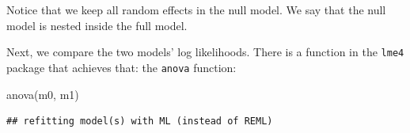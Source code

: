 \documentclass[
  12pt,
]{krantz}
\newenvironment{Shaded}{\begin{snugshade}}{\end{snugshade}}
\newcommand{\DecValTok}[1]{\textcolor[rgb]{0.00,0.00,0.81}{#1}}
\newcommand{\FunctionTok}[1]{\textcolor[rgb]{0.00,0.00,0.00}{#1}}
\newcommand{\NormalTok}[1]{#1}
\newcommand{\OtherTok}[1]{\textcolor[rgb]{0.56,0.35,0.01}{#1}}
\newcommand{\SpecialCharTok}[1]{\textcolor[rgb]{0.00,0.00,0.00}{#1}}
\newcommand{\StringTok}[1]{\textcolor[rgb]{0.31,0.60,0.02}{#1}}
\theoremstyle{definition}
\theoremstyle{definition}
\theoremstyle{definition}
\theoremstyle{definition}
\theoremstyle{remark}
\begin{document}
\begin{Shaded}
\end{Shaded}

Notice that we keep all random effects in the null model. We say that the null model is nested inside the full model.

Next, we compare the two models' log likelihoods. There is a function in the \texttt{lme4} package that achieves that: the \texttt{anova} function:

\begin{Shaded}
\begin{Highlighting}[]
\FunctionTok{anova}\NormalTok{(m0, m1)}
\end{Highlighting}
\end{Shaded}

\begin{verbatim}
## refitting model(s) with ML (instead of REML)
\end{verbatim}
\end{document}
